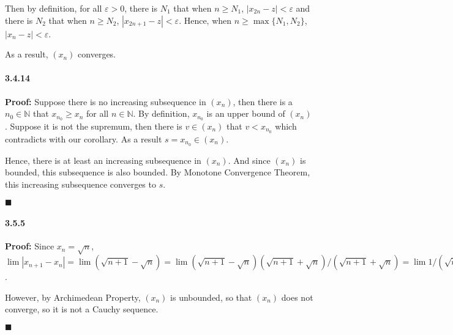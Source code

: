 \documentclass[11pt]{article}
\newcommand{\qed}{\begin{flushright}
					$\blacksquare$
				  \end{flushright}}
\begin{document}
		Then by definition, for all $\varepsilon > 0$, there is $N_1$ that when $n \geq N_1$, $|x_{2n} - z| < \varepsilon$ and there is $N_2$ that when $n \geq N_2$, $|x_{2n + 1} - z| < \varepsilon$. Hence, when $n \geq \max\{N_1, N_2\}$, $|x_n - z| < \varepsilon$.
		
		As a result, $(x_n)$ converges.
	\paragraph{3.4.14} \textbf{Proof:}
		Suppose there is no increasing subsequence in $(x_n)$, then there is a $n_0 \in \mathbb{N}$ that $x_{n_0} \geq x_n$ for all $n \in \mathbb{N}$. By definition, $x_{n_0}$ is an upper bound of $(x_n)$. Suppose it is not the supremum, then there is $v \in (x_n)$ that $v < x_{n_0}$ which contradicts with our corollary. As a result $s = x_{n_0} \in (x_n)$.
		
		Hence, there is at least an increasing subsequence in $(x_n)$. And since $(x_n)$ is bounded, this subsequence is also bounded. By Monotone Convergence Theorem, this increasing subsequence converges to $s$.
		\qed 
	\paragraph{3.5.5} \textbf{Proof:}
		Since $x_n = \sqrt{n}$, $\lim |x_{n + 1} - x_n| = \lim (\sqrt{n + 1} - \sqrt{n}) = \lim (\sqrt{n + 1} - \sqrt{n})(\sqrt{n + 1} + \sqrt{n})/(\sqrt{n + 1} + \sqrt{n}) = \lim 1/(\sqrt{n + 1} + \sqrt{n}) = 0$. 
		
		However, by Archimedean Property, $(x_n)$ is unbounded, so that $(x_n)$ does not converge, so it is not a Cauchy sequence.
		\qed
\end{document}
